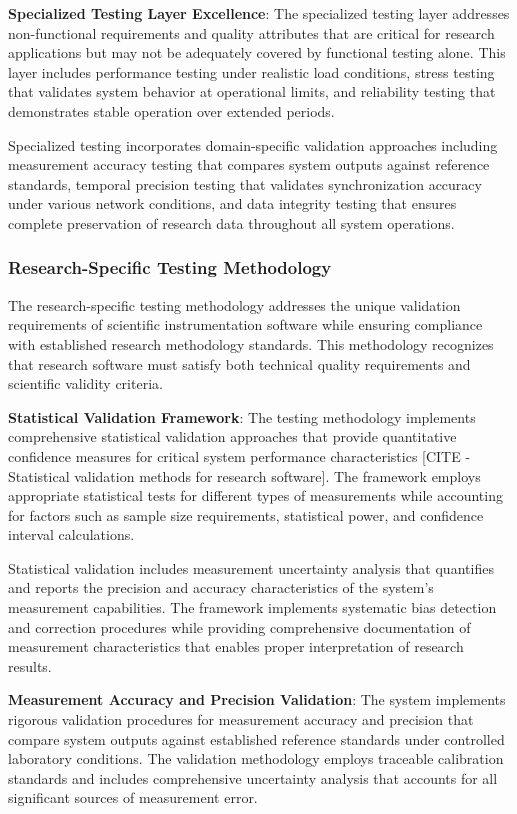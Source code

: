 \documentclass[12pt,a4paper]{report}
\begin{document}
\textbf{Specialized Testing Layer Excellence}: The specialized testing layer addresses non-functional requirements and
quality attributes that are critical for research applications but may not be adequately covered by functional testing
alone. This layer includes performance testing under realistic load conditions, stress testing that validates system
behavior at operational limits, and reliability testing that demonstrates stable operation over extended periods.

Specialized testing incorporates domain-specific validation approaches including measurement accuracy testing that
compares system outputs against reference standards, temporal precision testing that validates synchronization accuracy
under various network conditions, and data integrity testing that ensures complete preservation of research data
throughout all system operations.

\subsubsection{Research-Specific Testing Methodology}

The research-specific testing methodology addresses the unique validation requirements of scientific instrumentation
software while ensuring compliance with established research methodology standards. This methodology recognizes that
research software must satisfy both technical quality requirements and scientific validity criteria.

\textbf{Statistical Validation Framework}: The testing methodology implements comprehensive statistical validation approaches
that provide quantitative confidence measures for critical system performance
characteristics [CITE - Statistical validation methods for research software]. The framework employs appropriate
statistical tests for different types of measurements while accounting for factors such as sample size requirements,
statistical power, and confidence interval calculations.

Statistical validation includes measurement uncertainty analysis that quantifies and reports the precision and accuracy
characteristics of the system's measurement capabilities. The framework implements systematic bias detection and
correction procedures while providing comprehensive documentation of measurement characteristics that enables proper
interpretation of research results.

\textbf{Measurement Accuracy and Precision Validation}: The system implements rigorous validation procedures for measurement
accuracy and precision that compare system outputs against established reference standards under controlled laboratory
conditions. The validation methodology employs traceable calibration standards and includes comprehensive uncertainty
analysis that accounts for all significant sources of measurement error.
\end{document}
